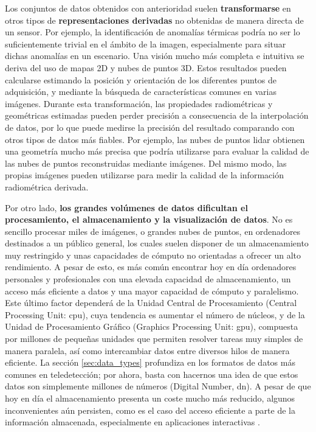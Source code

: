 Los conjuntos de datos obtenidos con anterioridad suelen \textbf{transformarse} en otros tipos de \textbf{representaciones derivadas} no obtenidas de manera directa de un sensor. Por ejemplo, la identificación de anomalías térmicas podría no ser lo suficientemente trivial en el ámbito de la imagen, especialmente para situar dichas anomalías en un escenario. Una visión mucho más completa e intuitiva se deriva del uso de mapas 2D y nubes de puntos 3D. Estos resultados pueden calcularse estimando la posición y orientación de los diferentes puntos de adquisición, y mediante la búsqueda de características comunes en varias imágenes. Durante esta transformación, las propiedades radiométricas y geométricas estimadas pueden perder precisión a consecuencia de la interpolación de datos, por lo que puede medirse la precisión del resultado comparando con otros tipos de datos más fiables. Por ejemplo, las nubes de puntos \acrshort{lidar} obtienen una geometría mucho más precisa que podría utilizarse para evaluar la calidad de las nubes de puntos reconstruidas mediante imágenes. Del mismo modo, las propias imágenes pueden utilizarse para medir la calidad de la información radiométrica derivada.   

Por otro lado, \textbf{los grandes volúmenes de datos dificultan el procesamiento, el almacenamiento y la visualización de datos}. No es sencillo procesar miles de imágenes, o grandes nubes de puntos, en ordenadores destinados a un público general, los cuales suelen disponer de un almacenamiento muy restringido y unas capacidades de cómputo no orientadas a ofrecer un alto rendimiento. A pesar de esto, es más común encontrar hoy en día ordenadores personales y profesionales con una elevada capacidad de almacenamiento, un acceso más eficiente a datos y una mayor capacidad de cómputo y paralelismo. Este último factor dependerá de la Unidad Central de Procesamiento (Central Processing Unit: \acrshort{cpu}), cuya tendencia es aumentar el número de núcleos, y de la Unidad de Procesamiento Gráfico (Graphics Processing Unit: \acrshort{gpu}), compuesta por millones de pequeñas unidades que permiten resolver tareas muy simples de manera paralela, así como intercambiar datos entre diversos hilos de manera eficiente. La sección \ref{sec:data_types} profundiza en los formatos de datos más comunes en teledetección; por ahora, basta con hacernos una idea de que estos datos son simplemente millones de números (Digital Number, \acrshort{dn}). A pesar de que hoy en día el almacenamiento presenta un coste mucho más reducido, algunos inconvenientes aún persisten, como es el caso del acceso eficiente a parte de la información almacenada, especialmente en aplicaciones interactivas \cite{bejar-martos_strategies_2022, ogayar-anguita_nested_2023}. 

